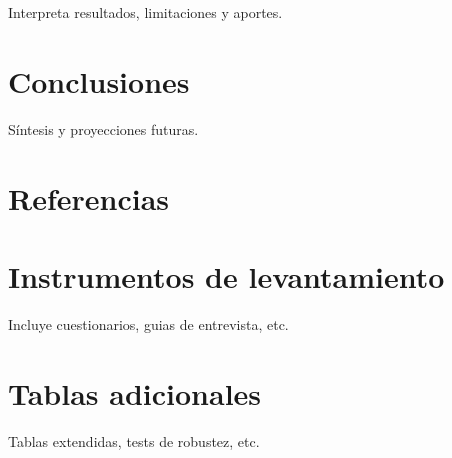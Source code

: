 \documentclass[
  spanish,
  a4paper,
  oneside]{scrbook}
\begin{document}
Interpreta resultados, limitaciones y aportes.


\chapter{Conclusiones}\label{conclusiones}

Síntesis y proyecciones futuras.


\chapter{Referencias}\label{referencias}

\label{refs}

\cleardoublepage
{}
{}
\appendix

\chapter{Instrumentos de
levantamiento}\label{instrumentos-de-levantamiento}

Incluye cuestionarios, guias de entrevista, etc.

\chapter{Tablas adicionales}\label{tablas-adicionales}

Tablas extendidas, tests de robustez, etc.


\backmatter

\mainmatter
\pagestyle{scrheadings}

\end{document}
